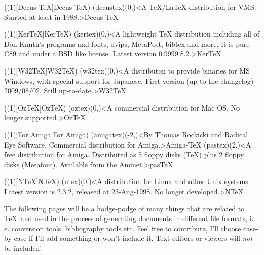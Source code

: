 \tograph(\tostruct(1)[Decus \TeX]{Decus \TeX}){
	\tonode[\histdistro](decustex)(0,\layer)<A TeX/LaTeX distribution for VMS. Started at least in 1988.>{Decus \TeX}
}

\tograph(\tostruct(1)[Ker\TeX]{Ker\TeX}){
	\tonode(kertex)(0,\layer)<A lightweight TeX distribution including all of Don Knuth's programs and fonts, dvips, MetaPost, bibtex and more. It is pure C89 and under a BSD like license. Latest version 0.9999.8.2.>{Ker\TeX}
}

\tograph(\tostruct(1)[W32\TeX]{W32\TeX}){
	\tonode(w32tex)(0,\layer)<A distributon to provide binaries for MS Windows, with special support for Japanese. First version (up to the changelog) 2009/08/02. Still up-to-date.>{W32\TeX}
}

\tograph(\tostruct(1)[OzTeX]{OzTeX}){
	\tonode[\histdistro](oztex)(0,\layer)<A commercial distribution for Mac OS. No longer supported.>{Oz\TeX}
}

\tograph(\tostruct(1)[For Amiga]{For Amiga}){
	\tonode[\histdistro](amigatex)(-2,\layer)<By Thomas Rockicki and Radical Eye Software. Commercial distribution for Amiga.>{Amiga-TeX}
	\tonode[\histdistro](pastex)(2,\layer)<A free distribution for Amiga. Distributed as 5 floppy disks (TeX) plus 2 floppy disks (Metafont). Available from the Aminet.>{pasTeX}
}

\tograph(\tostruct(1)[N\TeX]{N\TeX}){
	\tonode[\histdistro](ntex)(0,\layer)<A distribution for Linux and other Unix systems. Latest version is 2.3.2, released at 23-Aug-1998. No longer developed.>{N\TeX}
}

\newpage
{}
\parbox{\textwidth}{\normalsize
The following pages will be a hodge-podge of many things that are related to \TeX\ and used in the process of generating documents in different file formats, i.\,e. conversion tools, bibliography tools etc. Feel free to contribute, I'll choose case-by-case if I'll add something or won't include it. Text editors or viewers will \emph{not} be included!
}

